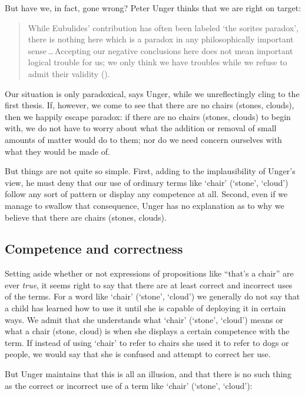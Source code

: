 \documentclass[11pt]{standalone} \newif\ifstandlone \standalonetrue
\newenvironment{squote}{%
	\begin{quote}\begin{singlespace}%
	}{%
	\end{singlespace}\end{quote}}
\begin{document}
\begin{spacing}{1.5}
But have we, in fact, gone wrong?  Peter Unger thinks that we are
right on target:

\begin{squote}
While Eubulides' contribution has often been labeled `the sorites
paradox', there is nothing here which is a paradox in any
philosophically important sense\,\ldots\,Accepting our negative
conclusions here does not mean important logical trouble for us; we
only think we have troubles while we refuse to admit their validity
(\citeyear[145]{unger1979}).
\end{squote}

Our situation is only paradoxical, says Unger, while we unreflectingly
cling to the first thesis.  If, however, we come to see that there are
no chairs (stones, clouds), then we happily escape paradox: if there
are no chairs (stones, clouds) to begin with, we do not have to worry
about what the addition or removal of small amounts of matter would do
to them; nor do we need concern ourselves with what they would be made
of.

But things are not quite so simple.  First, adding to the
implausibility of Unger's view, he must deny that our use of ordinary
terms like `chair' (`stone', `cloud') follow any sort of pattern or
display any competence at all.  Second, even if we manage to swallow
that consequence, Unger has no explanation as to why we believe that
there are chairs (stones, clouds).

\subsection{Competence and correctness}
Setting aside whether or not expressions of propositions like ``that's
a chair'' are ever \emph{true}, it seems right to say that there are
at least correct and incorrect uses of the terms.  For a word like
`chair' (`stone', `cloud') we generally do not say that a child has
learned how to use it until she is capable of deploying it in certain
ways.  We admit that she understands what `chair' (`stone', `cloud')
means or what a chair (stone, cloud) is when she displays a certain
competence with the term.  If instead of using `chair' to refer to
chairs she used it to refer to dogs or people, we would say that she
is confused and attempt to correct her use.

But Unger maintains that this is all an illusion, and that there is no
such thing as the correct or incorrect use of a term like `chair'
(`stone', `cloud'):


\end{spacing}
\end{document}
